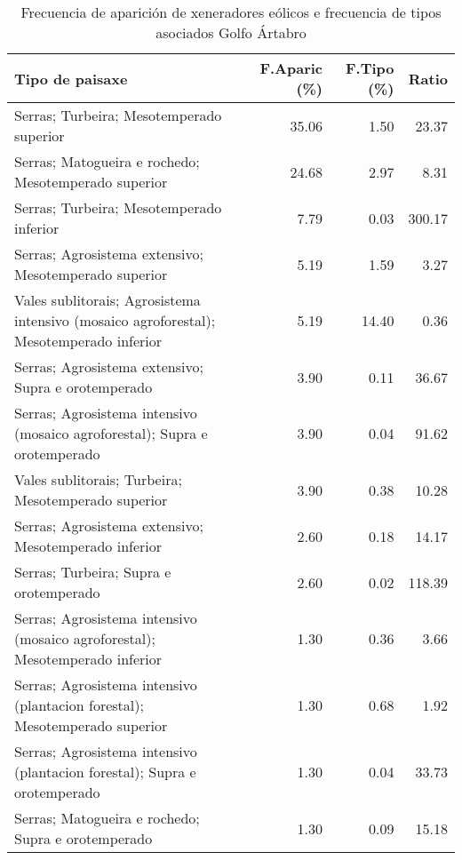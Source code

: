 \begin{table}[p]
\centering
\caption{Frecuencia de aparición de xeneradores eólicos e frecuencia de tipos asociados Golfo Ártabro} 
\label{veolico1}
\begin{tabular}{lrrr}
  \hline
Tipo de paisaxe & F.Aparic (\%) & F.Tipo (\%) & Ratio \\ 
  \hline
Serras; Turbeira; Mesotemperado superior & 35.06 & 1.50 & 23.37 \\ 
  Serras; Matogueira e rochedo; Mesotemperado superior & 24.68 & 2.97 & 8.31 \\ 
  Serras; Turbeira; Mesotemperado inferior & 7.79 & 0.03 & 300.17 \\ 
  Serras; Agrosistema extensivo; Mesotemperado superior & 5.19 & 1.59 & 3.27 \\ 
  Vales sublitorais; Agrosistema intensivo (mosaico agroforestal); Mesotemperado inferior & 5.19 & 14.40 & 0.36 \\ 
  Serras; Agrosistema extensivo; Supra e orotemperado & 3.90 & 0.11 & 36.67 \\ 
  Serras; Agrosistema intensivo (mosaico agroforestal); Supra e orotemperado & 3.90 & 0.04 & 91.62 \\ 
  Vales sublitorais; Turbeira; Mesotemperado superior & 3.90 & 0.38 & 10.28 \\ 
  Serras; Agrosistema extensivo; Mesotemperado inferior & 2.60 & 0.18 & 14.17 \\ 
  Serras; Turbeira; Supra e orotemperado & 2.60 & 0.02 & 118.39 \\ 
  Serras; Agrosistema intensivo (mosaico agroforestal); Mesotemperado inferior & 1.30 & 0.36 & 3.66 \\ 
  Serras; Agrosistema intensivo (plantacion forestal); Mesotemperado superior & 1.30 & 0.68 & 1.92 \\ 
  Serras; Agrosistema intensivo (plantacion forestal); Supra e orotemperado & 1.30 & 0.04 & 33.73 \\ 
  Serras; Matogueira e rochedo; Supra e orotemperado & 1.30 & 0.09 & 15.18 \\ 
   \hline
\end{tabular}
\end{table}
